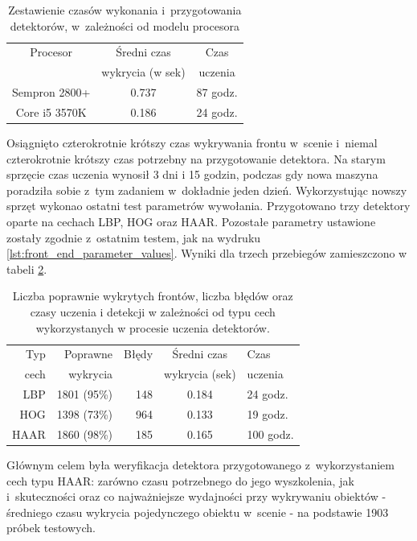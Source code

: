 \begin{table}[!h]
	\centering                                                          
	\caption{Zestawienie czasów wykonania i~przygotowania detektorów,
		w~zależności od modelu procesora}
	\begin{tabular}{c|c|c}
		Procesor  & Średni czas      & Czas     \\
		& wykrycia (w sek) & uczenia  \\
		\hline
		Sempron 2800+        & 0.737  & 87 godz. \\
		Core i5 3570K        & 0.186  & 24 godz. \\
	\end{tabular} 
	\label{tab:lbp_hog_haar}
\end{table}

Osiągnięto czterokrotnie krótszy czas wykrywania frontu w~scenie i~niemal 
czterokrotnie krótszy czas potrzebny na przygotowanie detektora. Na starym 
sprzęcie czas uczenia wynosił 3 dni i 15 godzin, podczas gdy nowa maszyna
poradziła sobie z~tym zadaniem w~dokładnie jeden dzień. Wykorzystując nowszy
sprzęt wykonao ostatni test parametrów wywołania. Przygotowano trzy detektory
oparte na cechach LBP, HOG oraz HAAR. Pozostałe parametry ustawione zostały
zgodnie z~ostatnim testem, jak na wydruku \ref{lst:front_end_parameter_values}.
Wyniki dla trzech przebiegów zamieszczono w tabeli \ref{tab:cpu_comparison}.

\begin{table}[!h]
	\centering                                                          
	\caption{Liczba poprawnie wykrytych frontów, liczba błędów oraz czasy uczenia 
		i detekcji w zależności od typu cech wykorzystanych w procesie uczenia 
		detektorów.}
	\begin{tabular}{r|r|r|c|l}
		Typ    & Poprawne     & Błędy  & Średni czas    & Czas     \\
		cech   & wykrycia     &        & wykrycia (sek) & uczenia  \\
		\hline
		LBP        & 1801 (95\%)  & 148    & 0.184   & 24 godz.\\
		HOG        & 1398 (73\%)  & 964    & 0.133   & 19 godz.\\
		HAAR       & 1860 (98\%)  & 185    & 0.165   & 100 godz.\\
	\end{tabular} 
	\label{tab:cpu_comparison}
\end{table}

Głównym celem była weryfikacja detektora przygotowanego z~wykorzystaniem
cech typu HAAR: zarówno czasu potrzebnego do jego wyszkolenia, jak i~skuteczności
oraz co najważniejsze wydajności przy wykrywaniu obiektów - średniego czasu 
wykrycia pojedynczego obiektu w~scenie - na podstawie 1903 próbek testowych.

